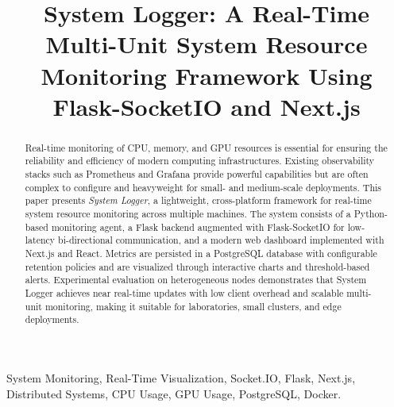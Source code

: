 \documentclass[conference]{IEEEtran}
\begin{document}
\title{System Logger: A Real-Time Multi-Unit System Resource Monitoring Framework Using Flask-SocketIO and Next.js}

\author{%
}

\maketitle

\begin{abstract}
Real-time monitoring of CPU, memory, and GPU resources is essential for ensuring the reliability and efficiency of modern computing infrastructures. Existing observability stacks such as Prometheus and Grafana provide powerful capabilities but are often complex to configure and heavyweight for small- and medium-scale deployments. This paper presents \emph{System Logger}, a lightweight, cross-platform framework for real-time system resource monitoring across multiple machines. The system consists of a Python-based monitoring agent, a Flask backend augmented with Flask-SocketIO for low-latency bi-directional communication, and a modern web dashboard implemented with Next.js and React. Metrics are persisted in a PostgreSQL database with configurable retention policies and are visualized through interactive charts and threshold-based alerts. Experimental evaluation on heterogeneous nodes demonstrates that System Logger achieves near real-time updates with low client overhead and scalable multi-unit monitoring, making it suitable for laboratories, small clusters, and edge deployments.
\end{abstract}

\begin{IEEEkeywords}
System Monitoring, Real-Time Visualization, Socket.IO, Flask, Next.js, Distributed Systems, CPU Usage, GPU Usage, PostgreSQL, Docker.
\end{IEEEkeywords}
\end{document}
